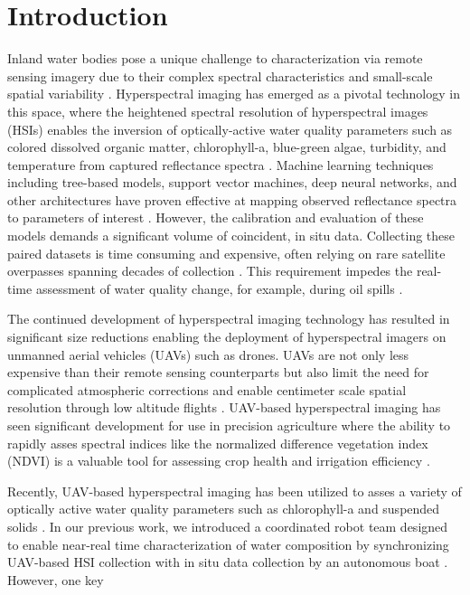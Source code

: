 \documentclass{article}
\begin{document}
\section{Introduction}

Inland water bodies pose a unique challenge to characterization via remote sensing imagery due to their complex spectral characteristics and small-scale spatial variability \cite{koponen2002lake,ritchie2003remote}. Hyperspectral imaging has emerged as a pivotal technology in this space, where the heightened spectral resolution of hyperspectral images (HSIs) enables the inversion of optically-active water quality parameters such as colored dissolved organic matter, chlorophyll-a, blue-green algae, turbidity, and temperature from captured reflectance spectra \cite{brando2003satellite,moses2012estimation}. Machine learning techniques including tree-based models, support vector machines, deep neural networks, and other architectures have proven effective at mapping observed reflectance spectra to parameters of interest \cite{thenkabail2018hyperspectral,keller2018hyperspectral, ghatkar2019classification,sagan2020monitoring}. However, the calibration and evaluation of these models demands a significant volume of coincident, in situ data. Collecting these paired datasets is time consuming and expensive, often relying on rare satellite overpasses spanning decades of collection \cite{aurin2018remote, ross2019aquasat}. This requirement impedes the real-time assessment of water quality change, for example, during oil spills \cite{fingas2014review,fingas2017review}.

The continued development of hyperspectral imaging technology has resulted in significant size reductions enabling the deployment of hyperspectral imagers on unmanned aerial vehicles (UAVs) such as drones. UAVs are not only less expensive than their remote sensing counterparts but also limit the need for complicated atmospheric corrections and enable centimeter scale spatial resolution through low altitude flights \cite{adao2017hyperspectral, arroyo2019implementation, banerjee2020uav}. UAV-based hyperspectral imaging has seen significant development for use in precision agriculture where the ability to rapidly asses spectral indices like the normalized difference vegetation index (NDVI) is a valuable tool for assessing crop health and irrigation efficiency \cite{horstrand2019uav}.


Recently, UAV-based hyperspectral imaging has been utilized to asses a variety of optically active water quality parameters such as chlorophyll-a and suspended solids \cite{lu2021retrieval, zhang2022selection}. In our previous work, we introduced a coordinated robot team designed to enable near-real time characterization of water composition by synchronizing UAV-based HSI collection with in situ data collection by an autonomous boat \cite{robot-team-1, robot-team-2}. However, one key 
\end{document}
